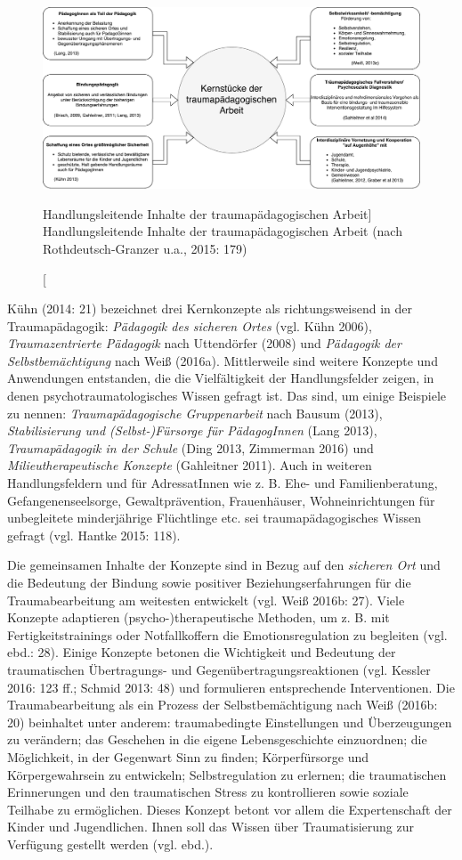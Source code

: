\begin{figure}[h]
  \centering
  \includegraphics[scale=0.45]{abbildung2}
  \caption
      [Handlungsleitende Inhalte der traumapädagogischen Arbeit]
      {Handlungsleitende Inhalte der traumapädagogischen Arbeit (nach Rothdeutsch-Granzer u.a., 2015: 179)}
  \label{fig:inhalte}
\end{figure}

Kühn (2014: 21) bezeichnet drei Kernkonzepte als richtungsweisend in der Traumap{\"a}dagogik: \textit{Pädagogik des sicheren Ortes} (vgl. Kühn 2006), \textit{Traumazentrierte Pädagogik} nach Uttendörfer (2008) und \textit{Pädagogik der Selbstbemächtigung} nach Weiß (2016a). Mittlerweile sind weitere Konzepte und Anwendungen entstanden, die die Vielfältigkeit der Handlungsfelder zeigen, in denen psychotraumatologisches Wissen gefragt ist. Das sind, um einige Beispiele zu nennen: \textit{Traumapädagogische Gruppenarbeit} nach Bausum (2013), \textit{Stabilisierung und (Selbst-)Fürsorge für PädagogInnen} (Lang 2013), \textit{Traumapädagogik in der Schule} (Ding 2013, Zimmerman 2016) und \textit{Milieutherapeutische Konzepte} (Gahleitner 2011). Auch in weiteren Handlungsfeldern und für AdressatInnen wie z. B. Ehe- und Familienberatung, Gefangenenseelsorge, Gewaltprävention, Frauenhäuser, Wohneinrichtungen für unbegleitete minderjährige Flüchtlinge etc. sei traumapädagogisches Wissen gefragt (vgl. Hantke 2015: 118).  

Die gemeinsamen Inhalte der Konzepte sind in Bezug auf den \textit{sicheren Ort} und die Bedeutung der Bindung sowie positiver Beziehungserfahrungen für die Traumabearbeitung am weitesten entwickelt (vgl. Weiß 2016b: 27). Viele Konzepte adaptieren (psycho-)therapeutische Methoden, um z. B. mit Fertigkeitstrainings oder Notfallkoffern die Emotionsregulation zu begleiten (vgl. ebd.: 28). Einige Konzepte betonen die Wichtigkeit und Bedeutung der traumatischen Übertragungs- und Gegenübertragungsreaktionen (vgl. Kessler 2016: 123 ff.; Schmid 2013: 48) und formulieren entsprechende Interventionen. Die Traumabearbeitung als ein Prozess der Selbstbemächtigung nach Weiß (2016b: 20) beinhaltet unter anderem: traumabedingte Einstellungen und Überzeugungen zu verändern; das Geschehen in die eigene Lebensgeschichte einzuordnen; die Möglichkeit, in der Gegenwart Sinn zu finden; Körperfürsorge und Körpergewahrsein zu entwickeln; Selbstregulation zu erlernen; die traumatischen Erinnerungen und den traumatischen Stress zu kontrollieren sowie soziale Teilhabe zu ermöglichen. Dieses Konzept betont vor allem die Expertenschaft der Kinder und Jugendlichen. Ihnen soll das Wissen über Traumatisierung zur Verfügung gestellt werden (vgl. ebd.).  

